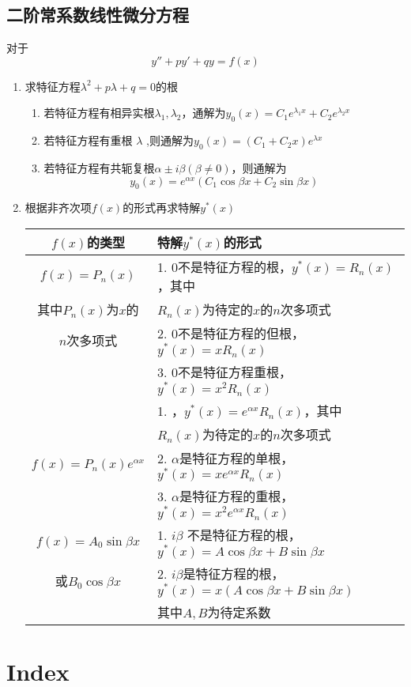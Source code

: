 \documentclass[11pt]{article}
\begin{document}
\subsection{二阶常系数线性微分方程}
\label{sec:org7bdb6c2}
对于
\begin{equation*}
y''+py'+qy=f(x)
\end{equation*}
\begin{enumerate}
\item 求特征方程\(\lambda^2+p\lambda+q=0\)的根
\begin{enumerate}
\item 若特征方程有相异实根\(\lambda_1,\lambda_2\)，通解为\(y_0(x)=C_1e^{\lambda_1x}+C_2e^{\lambda_2x}\)
\item 若特征方程有重根 \(\lambda\) ,则通解为\(y_0(x)=(C_1+C_2x)e^{\lambda x}\)
\item 若特征方程有共轭复根\(\alpha\pm i\beta(\beta\neq0)\)，则通解为
\begin{equation*}
y_0(x)=e^{\alpha x}(C_1\cos\beta x+C_2\sin\beta x)
\end{equation*}
\end{enumerate}
\item 根据非齐次项\(f(x)\)的形式再求特解\(y^*(x)\)

\begin{tabular}{|c|l|}
\hline
\(f(x)\)的类型&特解\(y^*(x)\)的形式 \\\hline
\(f(x)=P_n(x)\)&1. 0不是特征方程的根，\(y^*(x)=R_n(x)\)，其中\\
其中\(P_n(x)\)为\(x\)的&\(R_n(x)\)为待定的\(x\)的\(n\)次多项式\\
\(n\)次多项式&2. 0不是特征方程的但根，\(y^*(x)=xR_n(x)\)\\
&3. 0不是特征方程重根，\(y^*(x)=x^2R_n(x)\)\\\hline
&1. ，\(y^*(x)=e^{\alpha x}R_n(x)\)，其中\\
&\(R_n(x)\)为待定的\(x\)的\(n\)次多项式\\
\(f(x)=P_n(x)e^{\alpha x}\)&2. \(\alpha\)是特征方程的单根，\(y^*(x)=xe^{\alpha x}R_n(x)\)\\
&3. \(\alpha\)是特征方程的重根，\(y^*(x)=x^2e^{\alpha x}R_n(x)\)\\\hline
\(f(x)=A_0\sin\beta x\)&1. \(i\beta\) 不是特征方程的根，\(y^*(x)=A\cos\beta x+B\sin\beta x\)\\
或\(B_0\cos\beta x\)&2. \(i\beta\)是特征方程的根，\(y^*(x)=x(A\cos\beta x+B\sin\beta x)\)\\
&其中\(A,B\)为待定系数\\\hline
\end{tabular}
\end{enumerate}

\section{Index}
\label{sec:org4802ef3}
\renewcommand{\indexname}{}
\printindex
\end{document}

